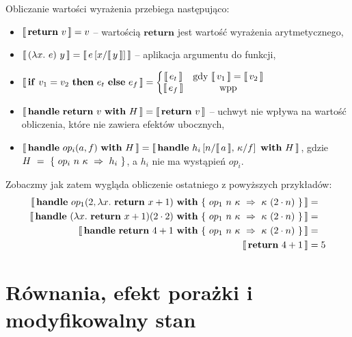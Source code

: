 Obliczanie wartości wyrażenia przebiega następująco:
\begin{itemize}
\item \(\llbracket\, \mathbf{return}\ v\, \rrbracket = v\) -- wartością \(\mathbf{return}\) jest wartość wyrażenia arytmetycznego,
\item \(\llbracket\, (\lambda x.\ e)\ y\, \rrbracket = \llbracket\, e \left[x / \llbracket\, y\, \rrbracket\right]\, \rrbracket\) -- aplikacja argumentu do funkcji,
\item
  \(\begin{aligned}[t]
    \llbracket\, \mathbf{if}\ v_1 = v_2\ \mathbf{then}\ e_t\ \mathbf{else}\ e_f\, \rrbracket = \left\{\begin{matrix}
    \llbracket\, e_t\, \rrbracket & \text{gdy }\llbracket\, v_1\, \rrbracket = \llbracket\, v_2\, \rrbracket \\ 
    \llbracket\, e_f\, \rrbracket & \text{wpp}
    \end{matrix}\right.
  \end{aligned}\)
\item \(\llbracket\, \mathbf{handle}\ \mathbf{return}\ v\ \mathbf{with}\ H\, \rrbracket = \llbracket\, \mathbf{return}\ v\, \rrbracket\) -- uchwyt nie wpływa na wartość obliczenia, które nie zawiera efektów ubocznych,
\item \(\llbracket\, \mathbf{handle}\ op_{i}(a, f)\ \mathbf{with}\ H\, \rrbracket = \llbracket\, \mathbf{handle}\ h_i \left[n / \llbracket\, a\, \rrbracket,\, \kappa / f\right]\ \mathbf{with}\ H\, \rrbracket \), gdzie \(H~=~\{\ \hcase{op_i}{n\ \kappa}{h_i} \ \}\), a \(h_i\) nie ma wystąpień \(op_i\).
  
\end{itemize}

Zobaczmy jak zatem wygląda obliczenie ostatniego z powyższych przykładów:
\begin{equation}\begin{split}
  \eval{\handle{\opi{1}{2}{\fun{x}{\return{x + 1}}}}{\{\ \hcase{op_1}{n\ \kappa}{\kappa\ (2 \cdot n)} \ \}}} &= \\
  \eval{\handle{(\fun{x}{\return{x+1}}) (2 \cdot 2)}{\{\ \hcase{op_1}{n\ \kappa}{\kappa\ (2 \cdot n)} \ \}}} &= \\
  \eval{\handle{\return{4+1}}{\{\ \hcase{op_1}{n\ \kappa}{\kappa\ (2 \cdot n)} \ \}}} &= \\
  \eval{\return{4 + 1}} &= 5
\end{split}\end{equation}


\section{Równania, efekt porażki i modyfikowalny stan}

